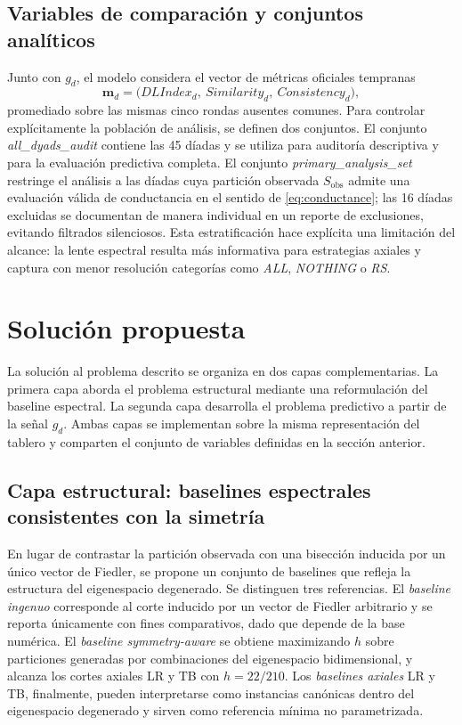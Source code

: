 \documentclass[journal]{IEEEtran}
\newcommand{\Sobs}{S_{\mathrm{obs}}}
\begin{document}
\subsection{Variables de comparación y conjuntos analíticos}

Junto con $g_d$, el modelo considera el vector de métricas oficiales tempranas
\[
\mathbf{m}_d = \bigl(DLIndex_d,\ Similarity_d,\ Consistency_d\bigr),
\]
promediado sobre las mismas cinco rondas ausentes comunes. Para controlar explícitamente la población de análisis, se definen dos conjuntos. El conjunto \emph{all\_dyads\_audit} contiene las 45 díadas y se utiliza para auditoría descriptiva y para la evaluación predictiva completa. El conjunto \emph{primary\_analysis\_set} restringe el análisis a las díadas cuya partición observada $\Sobs$ admite una evaluación válida de conductancia en el sentido de \eqref{eq:conductance}; las 16 díadas excluidas se documentan de manera individual en un reporte de exclusiones, evitando filtrados silenciosos. Esta estratificación hace explícita una limitación del alcance: la lente espectral resulta más informativa para estrategias axiales y captura con menor resolución categorías como \emph{ALL}, \emph{NOTHING} o \emph{RS}.

\section{Solución propuesta}

La solución al problema descrito se organiza en dos capas complementarias. La primera capa aborda el problema estructural mediante una reformulación del baseline espectral. La segunda capa desarrolla el problema predictivo a partir de la señal $g_d$. Ambas capas se implementan sobre la misma representación del tablero y comparten el conjunto de variables definidas en la sección anterior.

\subsection{Capa estructural: baselines espectrales consistentes con la simetría}

En lugar de contrastar la partición observada con una bisección inducida por un único vector de Fiedler, se propone un conjunto de baselines que refleja la estructura del eigenespacio degenerado. Se distinguen tres referencias. El \emph{baseline ingenuo} corresponde al corte inducido por un vector de Fiedler arbitrario y se reporta únicamente con fines comparativos, dado que depende de la base numérica. El \emph{baseline symmetry-aware} se obtiene maximizando $h$ sobre particiones generadas por combinaciones del eigenespacio bidimensional, y alcanza los cortes axiales LR y TB con $h=22/210$. Los \emph{baselines axiales} LR y TB, finalmente, pueden interpretarse como instancias canónicas dentro del eigenespacio degenerado y sirven como referencia mínima no parametrizada.
\end{document}
